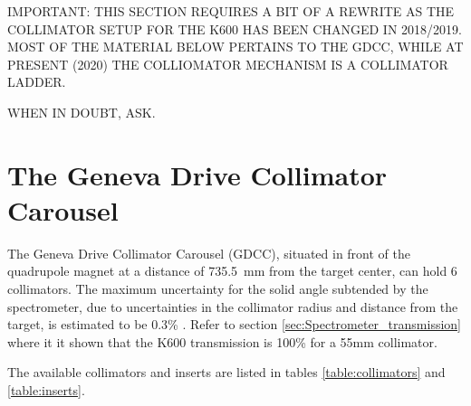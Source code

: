 \documentclass[11pt]{report}
\begin{document}


IMPORTANT: THIS SECTION REQUIRES A BIT OF A REWRITE AS THE COLLIMATOR SETUP FOR THE K600
HAS BEEN CHANGED IN 2018/2019. MOST OF THE MATERIAL BELOW PERTAINS TO THE GDCC, WHILE AT
PRESENT (2020) THE COLLIOMATOR MECHANISM IS A COLLIMATOR LADDER.

WHEN IN DOUBT, ASK.

\section{The Geneva Drive Collimator Carousel}

\bigskip


The Geneva Drive Collimator Carousel (GDCC), situated in front of the quadrupole magnet 
at a distance of 735.5~mm from the target center, can hold 6 
collimators.
The maximum uncertainty for the solid angle subtended by the
spectrometer, due to uncertainties in the collimator radius and distance
from the target, is estimated to be 0.3\% \cite{New96}.
Refer to section \ref{sec:Spectrometer_transmission} where it it shown that
the K600 transmission is 100\% for a 55mm collimator.



The available collimators and inserts are listed in tables \ref{table:collimators}
and \ref{table:inserts}.

\end{document}
